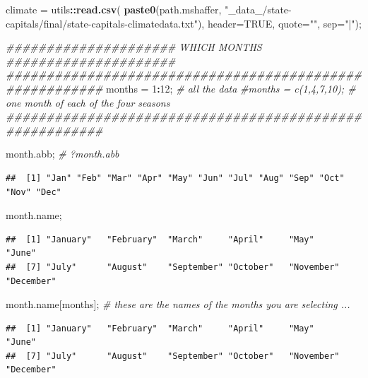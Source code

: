 \documentclass[
]{article}
\newenvironment{Shaded}{\begin{snugshade}}{\end{snugshade}}
\newcommand{\CommentTok}[1]{\textcolor[rgb]{0.56,0.35,0.01}{\textit{#1}}}
\newcommand{\DataTypeTok}[1]{\textcolor[rgb]{0.13,0.29,0.53}{#1}}
\newcommand{\DecValTok}[1]{\textcolor[rgb]{0.00,0.00,0.81}{#1}}
\newcommand{\KeywordTok}[1]{\textcolor[rgb]{0.13,0.29,0.53}{\textbf{#1}}}
\newcommand{\NormalTok}[1]{#1}
\newcommand{\OperatorTok}[1]{\textcolor[rgb]{0.81,0.36,0.00}{\textbf{#1}}}
\newcommand{\OtherTok}[1]{\textcolor[rgb]{0.56,0.35,0.01}{#1}}
\newcommand{\StringTok}[1]{\textcolor[rgb]{0.31,0.60,0.02}{#1}}
\begin{document}
\begin{Shaded}
\begin{Highlighting}[]
\NormalTok{climate =}\StringTok{ }\NormalTok{utils}\OperatorTok{::}\KeywordTok{read.csv}\NormalTok{( }\KeywordTok{paste0}\NormalTok{(path.mshaffer, }\StringTok{"\_data\_/state{-}capitals/final/state{-}capitals{-}climatedata.txt"}\NormalTok{), }\DataTypeTok{header=}\OtherTok{TRUE}\NormalTok{, }\DataTypeTok{quote=}\StringTok{""}\NormalTok{, }\DataTypeTok{sep=}\StringTok{"|"}\NormalTok{);}

\CommentTok{\#\#\#\#\#\#\#\#\#\#\#\#\#\#\#\#\#\#\#\#\# WHICH MONTHS \#\#\#\#\#\#\#\#\#\#\#\#\#\#\#\#\#\#\#\#\#}
\CommentTok{\#\#\#\#\#\#\#\#\#\#\#\#\#\#\#\#\#\#\#\#\#\#\#\#\#\#\#\#\#\#\#\#\#\#\#\#\#\#\#\#\#\#\#\#\#\#\#\#\#\#\#\#\#\#\#\#}
\NormalTok{months =}\StringTok{ }\DecValTok{1}\OperatorTok{:}\DecValTok{12}\NormalTok{; }\CommentTok{\# all the data}
\CommentTok{\#months = c(1,4,7,10); \# one month of each of the four seasons}
\CommentTok{\#\#\#\#\#\#\#\#\#\#\#\#\#\#\#\#\#\#\#\#\#\#\#\#\#\#\#\#\#\#\#\#\#\#\#\#\#\#\#\#\#\#\#\#\#\#\#\#\#\#\#\#\#\#\#\#}


\NormalTok{month.abb;  }\CommentTok{\# ?month.abb}
\end{Highlighting}
\end{Shaded}

\begin{verbatim}
##  [1] "Jan" "Feb" "Mar" "Apr" "May" "Jun" "Jul" "Aug" "Sep" "Oct" "Nov" "Dec"
\end{verbatim}

\begin{Shaded}
\begin{Highlighting}[]
\NormalTok{month.name;  }
\end{Highlighting}
\end{Shaded}

\begin{verbatim}
##  [1] "January"   "February"  "March"     "April"     "May"       "June"     
##  [7] "July"      "August"    "September" "October"   "November"  "December"
\end{verbatim}

\begin{Shaded}
\begin{Highlighting}[]
\NormalTok{month.name[months];  }\CommentTok{\# these are the names of the months you are selecting ...}
\end{Highlighting}
\end{Shaded}

\begin{verbatim}
##  [1] "January"   "February"  "March"     "April"     "May"       "June"     
##  [7] "July"      "August"    "September" "October"   "November"  "December"
\end{verbatim}
\end{document}
